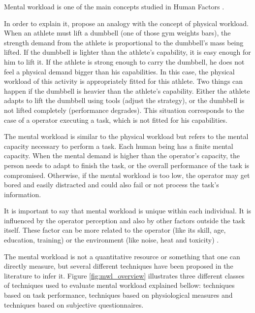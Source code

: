 Mental workload is one of the main concepts studied in Human Factors \cite{stanton2004handbook}.

In order to explain it,  propose an analogy with the concept of physical workload. When an athlete must lift a dumbbell (one of those gym weights bars), the strength demand from the athlete is proportional to the dumbbell's mass being lifted. If the dumbbell is lighter than the athlete's capability, it is easy enough for him to lift it. If the athlete is strong enough to carry the dumbbell, he does not feel a physical demand bigger than his capabilities. In this case, the physical workload of this activity is appropriately fitted for this athlete. Two things can happen if the dumbbell is heavier than the athlete's capability. Either the athlete adapts to lift the dumbbell using tools (adjust the strategy), or the dumbbell is not lifted completely (performance degrades). This situation corresponds to the case of a operator executing a task, which is not fitted for his capabilities.

The mental workload is similar to the physical workload but refers to the mental capacity necessary to perform a task. Each human being has a finite mental capacity. When the mental demand is higher than the operator's capacity, the person needs to adapt to finish the task, or the overall performance of the task is compromised. Otherwise, if the mental workload is too low, the operator may get bored and easily distracted and could also fail or not process the task's information.

It is important to say that mental workload is unique within each individual. It is influenced by the operator perception and also by other factors outside the task itself. These factor can be more related to the operator (like its skill, age, education, training) or the environment (like noise, heat and toxicity)  \cite{cain2007review, fallahi2016effects, cardoso2012evaluation}.

The mental workload is not a quantitative resource or something that one can directly measure, but several different techniques have been proposed in the literature to infer it. Figure \ref{fig:mwl_overview} illustrates three different classes of techniques used to evaluate mental workload explained bellow: techniques based on task performance, techniques based on physiological measures and techniques based on subjective questionnaires.
        
        
    
